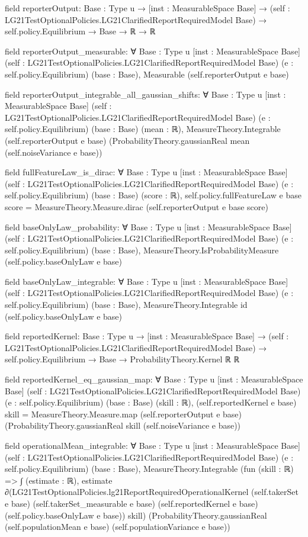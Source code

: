 \documentclass[10pt]{article}
\begin{document}
\begin{ReviewVerbatim}
field reporterOutput:
{Base : Type u} →
  [inst : MeasurableSpace Base] →
    (self : LG21TestOptionalPolicies.LG21ClarifiedReportRequiredModel Base) → self.policy.Equilibrium → Base → ℝ → ℝ

field reporterOutput_measurable:
∀ {Base : Type u} [inst : MeasurableSpace Base] (self : LG21TestOptionalPolicies.LG21ClarifiedReportRequiredModel Base)
  (e : self.policy.Equilibrium) (base : Base), Measurable (self.reporterOutput e base)

field reporterOutput_integrable_all_gaussian_shifts:
∀ {Base : Type u} [inst : MeasurableSpace Base] (self : LG21TestOptionalPolicies.LG21ClarifiedReportRequiredModel Base)
  (e : self.policy.Equilibrium) (base : Base) (mean : ℝ),
  MeasureTheory.Integrable (self.reporterOutput e base)
    (ProbabilityTheory.gaussianReal mean (self.noiseVariance e base))

field fullFeatureLaw_is_dirac:
∀ {Base : Type u} [inst : MeasurableSpace Base] (self : LG21TestOptionalPolicies.LG21ClarifiedReportRequiredModel Base)
  (e : self.policy.Equilibrium) (base : Base) (score : ℝ),
  self.policy.fullFeatureLaw e base score = MeasureTheory.Measure.dirac (self.reporterOutput e base score)

field baseOnlyLaw_probability:
∀ {Base : Type u} [inst : MeasurableSpace Base] (self : LG21TestOptionalPolicies.LG21ClarifiedReportRequiredModel Base)
  (e : self.policy.Equilibrium) (base : Base), MeasureTheory.IsProbabilityMeasure (self.policy.baseOnlyLaw e base)

field baseOnlyLaw_integrable:
∀ {Base : Type u} [inst : MeasurableSpace Base] (self : LG21TestOptionalPolicies.LG21ClarifiedReportRequiredModel Base)
  (e : self.policy.Equilibrium) (base : Base), MeasureTheory.Integrable id (self.policy.baseOnlyLaw e base)

field reportedKernel:
{Base : Type u} →
  [inst : MeasurableSpace Base] →
    (self : LG21TestOptionalPolicies.LG21ClarifiedReportRequiredModel Base) →
      self.policy.Equilibrium → Base → ProbabilityTheory.Kernel ℝ ℝ

field reportedKernel_eq_gaussian_map:
∀ {Base : Type u} [inst : MeasurableSpace Base] (self : LG21TestOptionalPolicies.LG21ClarifiedReportRequiredModel Base)
  (e : self.policy.Equilibrium) (base : Base) (skill : ℝ),
  (self.reportedKernel e base) skill =
    MeasureTheory.Measure.map (self.reporterOutput e base)
      (ProbabilityTheory.gaussianReal skill (self.noiseVariance e base))

field operationalMean_integrable:
∀ {Base : Type u} [inst : MeasurableSpace Base] (self : LG21TestOptionalPolicies.LG21ClarifiedReportRequiredModel Base)
  (e : self.policy.Equilibrium) (base : Base),
  MeasureTheory.Integrable
    (fun (skill : ℝ) =>
      ∫ (estimate : ℝ),
        estimate ∂(LG21TestOptionalPolicies.lg21ReportRequiredOperationalKernel (self.takerSet e base)
            (self.takerSet_measurable e base) (self.reportedKernel e base) (self.policy.baseOnlyLaw e base))
          skill)
    (ProbabilityTheory.gaussianReal (self.populationMean e base) (self.populationVariance e base))


\end{ReviewVerbatim}
\end{document}
